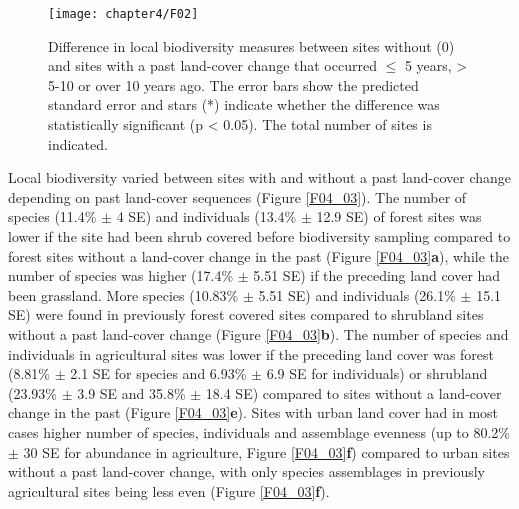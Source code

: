 \begin{figure}[htb]
\centering
\texttt{[image: chapter4/F02]}
\caption{ Difference in local biodiversity measures between sites without (0) and sites with a past land-cover change that occurred $\leq$ 5 years, > 5-10 or over 10 years ago. The error bars show the predicted standard error and stars (*) indicate whether the difference was statistically significant (p < 0.05). The total number of sites is indicated. }
\label{F04_02}
\end{figure}

Local biodiversity varied between sites with and without a past land-cover change depending on past land-cover sequences (Figure \ref{F04_03}). The number of species (11.4\% $\pm$ 4 SE) and individuals (13.4\% $\pm$ 12.9 SE) of forest sites was lower if the site had been shrub covered before biodiversity sampling compared to forest sites without a land-cover change in the past (Figure \ref{F04_03}\textbf{a}), while the number of species was higher (17.4\% $\pm$ 5.51 SE) if the preceding land cover had been grassland. More species (10.83\% $\pm$ 5.51 SE) and individuals (26.1\% $\pm$ 15.1 SE) were found in previously forest covered sites compared to shrubland sites without a past land-cover change (Figure \ref{F04_03}\textbf{b}). The number of species and individuals in agricultural sites was lower if the preceding land cover was forest (8.81\% $\pm$ 2.1 SE for species and 6.93\% $\pm$ 6.9 SE for individuals) or shrubland (23.93\% $\pm$ 3.9 SE and 35.8\% $\pm$ 18.4 SE) compared to sites without a land-cover change in the past (Figure \ref{F04_03}\textbf{e}). Sites with urban land cover had in most cases higher number of species, individuals and assemblage evenness (up to 80.2\% $\pm$ 30 SE for abundance in agriculture, Figure \ref{F04_03}\textbf{f}) compared to urban sites without a past land-cover change, with only species assemblages in previously agricultural sites being less even (Figure \ref{F04_03}\textbf{f}).

